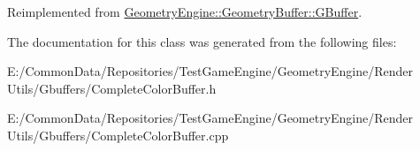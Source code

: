 Reimplemented from \mbox{\hyperlink{class_geometry_engine_1_1_geometry_buffer_1_1_g_buffer_a9f20eb78703ef048d59a54f90ee09f25}{Geometry\+Engine\+::\+Geometry\+Buffer\+::\+G\+Buffer}}.



The documentation for this class was generated from the following files\+:\begin{DoxyCompactItemize}
\item 
E\+:/\+Common\+Data/\+Repositories/\+Test\+Game\+Engine/\+Geometry\+Engine/\+Render Utils/\+Gbuffers/Complete\+Color\+Buffer.\+h\item 
E\+:/\+Common\+Data/\+Repositories/\+Test\+Game\+Engine/\+Geometry\+Engine/\+Render Utils/\+Gbuffers/Complete\+Color\+Buffer.\+cpp\end{DoxyCompactItemize}
